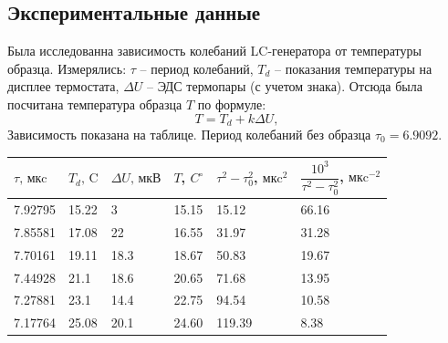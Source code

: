 \documentclass[a4paper, 14pt]{extarticle}%
\begin{document}
\subsection*{Экспериментальные данные}
Была исследованна зависимость колебаний LC-генератора от температуры образца. Измерялись: $\tau$ -- период колебаний, $T_d$ -- показания температуры на дисплее термостата, $\Delta U$ -- ЭДС термопары (с учетом знака). Отсюда была посчитана температура образца $T$ по формуле:
\[T = T_d + k\Delta U,\]
Зависимость показана на таблице. Период колебаний без образца $\tau_0 = 6.9092$.
\begin{table}[h!]
\begin{tabular}{|l|l|l|l|l|l|}
\hline
\rowcolor[HTML]{FFC702} 
$\tau \text{, мкc}$            & $T_d\text{, C}$             & $\Delta U \text{, мкВ}$       & $T$, $C^{\circ}$                       & $\tau^2 -\tau_0^2$, $\text{мкc}^2$    & $\dfrac{10^3}{\tau^2 - \tau_0^2}$, $\text{мкc}^{-2}$ \\ \hline
7.92795                        & 15.22                       & 3                           & 15.15                        & 15.12                        & 66.16                                      \\ \hline
\rowcolor[HTML]{FFFFC7} 
7.85581                         & 17.08                       & 22                          & 16.55                        & 31.97                        & 31.28                                      \\ \hline
7.70161                         & 19.11                       & 18.3                        & 18.67                        & 50.83                        & 19.67                                      \\ \hline
\rowcolor[HTML]{FFFFC7} 
{\color[HTML]{333333} 7.44928} & {\color[HTML]{333333} 21.1} & {\color[HTML]{333333} 18.6} & {\color[HTML]{333333} 20.65} & {\color[HTML]{333333} 71.68} & {\color[HTML]{333333} 13.95}               \\ \hline
7.27881                        & 23.1                        & 14.4                        & 22.75                        & 94.54                        & 10.58                                      \\ \hline
\rowcolor[HTML]{FFFFC7} 
7.17764                        & 25.08                       & 20.1                        & 24.60                        & 119.39                       & 8.38                                       \\ \hline

\end{tabular}
\end{table}
\end{document}
